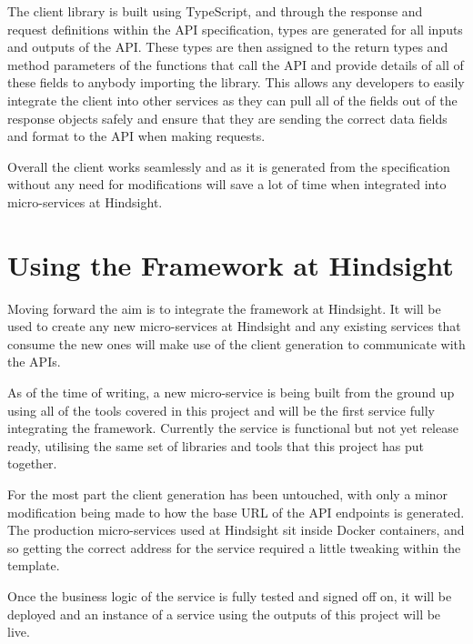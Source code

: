 The client library is built using TypeScript, and through the response and request definitions within the API specification, types are generated for all inputs and outputs of the API. These types are then assigned to the return types and method parameters of the functions that call the API and provide details of all of these fields to anybody importing the library. This allows any developers to easily integrate the client into other services as they can pull all of the fields out of the response objects safely and ensure that they are sending the correct data fields and format to the API when making requests.

Overall the client works seamlessly and as it is generated from the specification without any need for modifications will save a lot of time when integrated into micro-services at Hindsight.
\section{Using the Framework at Hindsight}
Moving forward the aim is to integrate the framework at Hindsight. It will be used to create any new micro-services at Hindsight and any existing services that consume the new ones will make use of the client generation to communicate with the APIs.

As of the time of writing, a new micro-service is being built from the ground up using all of the tools covered in this project and will be the first service fully integrating the framework. Currently the service is functional but not yet release ready, utilising the same set of libraries and tools that this project has put together. 

For the most part the client generation has been untouched, with only a minor modification being made to how the base URL of the API endpoints is generated. The production micro-services used at Hindsight sit inside Docker containers, and so getting the correct address for the service required a little tweaking within the template. 

Once the business logic of the service is fully tested and signed off on, it will be deployed and an instance of a service using the outputs of this project will be live.
